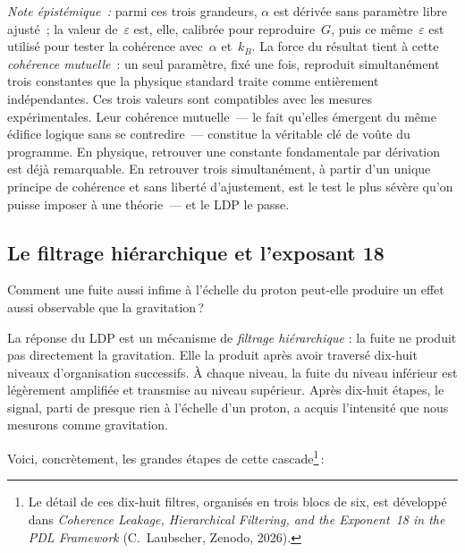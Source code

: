 \documentclass[12pt, a4paper, openright]{book}
\begin{document}
{\textit{Note épistémique~:} parmi ces trois grandeurs, $\alpha$ est dérivée sans paramètre libre ajusté~; la valeur de~$\varepsilon$ est, elle, calibrée pour reproduire~$G$, puis ce même~$\varepsilon$ est utilisé pour tester la cohérence avec~$\alpha$ et~$k_B$. La force du résultat tient à cette \emph{cohérence mutuelle}~: un seul paramètre, fixé une fois, reproduit simultanément trois constantes que la physique standard traite comme entièrement indépendantes. Ces trois valeurs sont compatibles avec les mesures expérimentales. Leur cohérence mutuelle~--- le fait qu'elles émergent du même édifice logique sans se contredire~--- constitue la véritable clé de voûte du programme. En physique, retrouver une constante fondamentale par dérivation est déjà remarquable. En retrouver trois simultanément, à partir d'un unique principe de cohérence et sans liberté d'ajustement, est le test le plus sévère qu'on puisse imposer à une théorie~--- et le LDP le passe.}

\subsection*{Le filtrage hiérarchique et l'exposant 18}

Comment une fuite aussi infime à l'échelle du proton peut-elle produire un effet aussi observable que la gravitation\,?

La réponse du LDP est un mécanisme de \emph{filtrage hiérarchique} : la fuite ne produit pas directement la gravitation. Elle la produit après avoir traversé dix-huit niveaux d'organisation successifs. À chaque niveau, la fuite du niveau inférieur est légèrement amplifiée et transmise au niveau supérieur. Après dix-huit étapes, le signal, parti de presque rien à l'échelle d'un proton, a acquis l'intensité que nous mesurons comme gravitation.

Voici, concrètement, les grandes étapes de cette cascade\footnote{%
  Le détail de ces dix-huit filtres, organisés en trois blocs de six, est développé dans \emph{Coherence Leakage, Hierarchical Filtering, and the Exponent~18 in the PDL Framework} (C.\ Laubscher, Zenodo, 2026).}\,:
\end{document}

